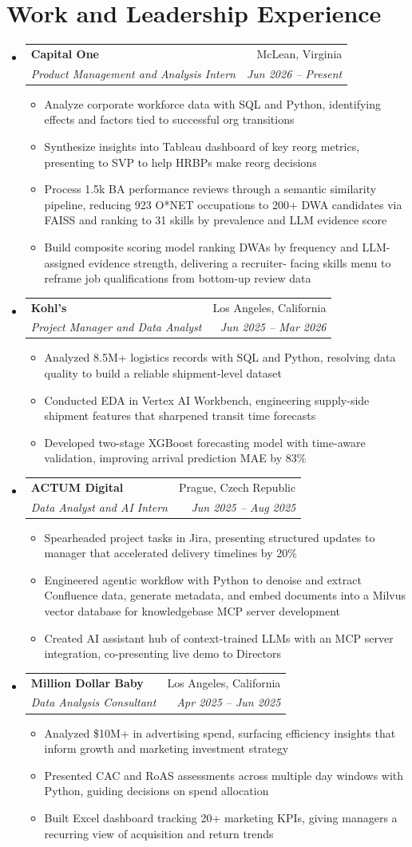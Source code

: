 \documentclass[letterpaper,11pt]{article}
\makeatletter
\newcommand{\resumeItem}[1]{
  \item\small{#1}
}
\newcommand{\resumeSubheading}[4]{
  \vspace{-2pt}\item
    \begin{tabular*}{\textwidth}[t]{l@{\extracolsep{\fill}}r}
      \textbf{#1} & #2 \\
      \textit{\small#3} & \textit{\small #4} \\
    \end{tabular*}\vspace{-7pt}
}
\newcommand{\resumeSubHeadingListStart}{\begin{itemize}[leftmargin=0in, label={}]}
\newcommand{\resumeSubHeadingListEnd}{\end{itemize}}
\newcommand{\resumeItemListStart}{\begin{itemize}[itemsep= 1.5pt, parsep=0pt]}
\newcommand{\resumeItemListEnd}{\end{itemize}\vspace{-5pt}}
\makeatother
\begin{document}
\section{Work and Leadership Experience}
  \resumeSubHeadingListStart
    \resumeSubheading
      {Capital One}{McLean, Virginia}
      {Product Management and Analysis Intern}{Jun 2026 -- Present}
      \resumeItemListStart
        \resumeItem{Analyze corporate workforce data with SQL and Python, identifying effects and factors tied to successful org transitions}
        \resumeItem{Synthesize insights into Tableau dashboard of key reorg metrics, presenting to SVP to help HRBPs make reorg decisions}
        \resumeItem{Process 1.5k BA performance reviews through a semantic similarity pipeline, reducing 923 O*NET occupations to 200+ DWA candidates via FAISS and ranking to 31 skills by prevalence and LLM evidence score}
        \resumeItem{Build composite scoring model ranking DWAs by frequency and LLM-assigned evidence strength, delivering a recruiter- facing skills menu to reframe job qualifications from bottom-up review data}
      \resumeItemListEnd
    \resumeSubheading
      {Kohl's}{Los Angeles, California}
      {Project Manager and Data Analyst}{Jun 2025 -- Mar 2026}
      \resumeItemListStart
        \resumeItem{Analyzed 8.5M+ logistics records with SQL and Python, resolving data quality to build a reliable shipment-level dataset}
        \resumeItem{Conducted EDA in Vertex AI Workbench, engineering supply-side shipment features that sharpened transit time forecasts}
        \resumeItem{Developed two-stage XGBoost forecasting model with time-aware validation, improving arrival prediction MAE by 83\%}
      \resumeItemListEnd
    \resumeSubheading
      {ACTUM Digital}{Prague, Czech Republic}
      {Data Analyst and AI Intern}{Jun 2025 -- Aug 2025}
      \resumeItemListStart
        \resumeItem{Spearheaded project tasks in Jira, presenting structured updates to manager that accelerated delivery timelines by 20\%}
        \resumeItem{Engineered agentic workflow with Python to denoise and extract Confluence data, generate metadata, and embed documents into a Milvus vector database for knowledgebase MCP server development}
        \resumeItem{Created AI assistant hub of context-trained LLMs with an MCP server integration, co-presenting live demo to Directors}
      \resumeItemListEnd
    \resumeSubheading
      {Million Dollar Baby}{Los Angeles, California}
      {Data Analysis Consultant}{Apr 2025 -- Jun 2025}
      \resumeItemListStart
        \resumeItem{Analyzed \$10M+ in advertising spend, surfacing efficiency insights that inform growth and marketing investment strategy}
        \resumeItem{Presented CAC and RoAS assessments across multiple day windows with Python, guiding decisions on spend allocation}
        \resumeItem{Built Excel dashboard tracking 20+ marketing KPIs, giving managers a recurring view of acquisition and return trends}
      \resumeItemListEnd
  \resumeSubHeadingListEnd
\end{document}
